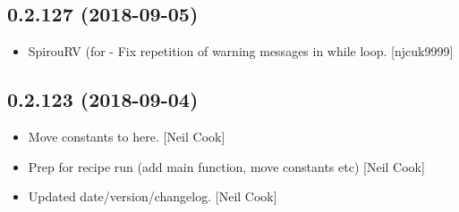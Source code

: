 \documentclass[a4paper,10pt,english]{report}
\begin{document}
\subsection{0.2.127 (2018-09-05)}
\label{\detokenize{misc/changelog:id338}}\begin{itemize}
\item {} 
SpirouRV (for  - Fix repetition of warning
messages in while loop. {[}njcuk9999{]}

\end{itemize}


\subsection{0.2.123 (2018-09-04)}
\label{\detokenize{misc/changelog:id339}}\begin{itemize}
\item {} 
Move  constants to here. {[}Neil Cook{]}

\item {} 
Prep  for recipe run (add main function, move constants
etc) {[}Neil Cook{]}

\item {} 
Updated date/version/changelog. {[}Neil Cook{]}

\end{itemize}
\end{document}
